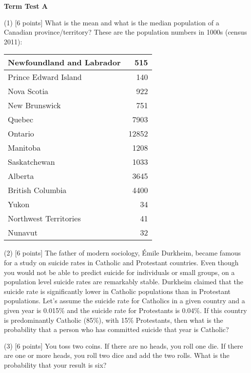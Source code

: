 \documentclass[11pt]{article}
\newcounter{aufg}
\newcommand{\aufgabe}[1]{\refstepcounter{aufg}\textbf{(\arabic{aufg})}
[#1 points]}
\begin{document}
\textbf{Term Test A}

(1) [6 points] What is the mean and what is the median population of a Canadian
province/territory? These are the population numbers in 1000s (census 2011):

\bigskip

\begin{tabular}{|l|r|} \hline
Newfoundland and Labrador & 515   \\ \hline
Prince Edward Island      & 140   \\ \hline
Nova Scotia               & 922   \\ \hline
New Brunswick             & 751   \\ \hline
Quebec                    & 7903  \\ \hline
Ontario                   & 12852 \\ \hline
Manitoba                  & 1208  \\ \hline
Saskatchewan              & 1033  \\ \hline
Alberta                   & 3645  \\ \hline
British Columbia          & 4400  \\ \hline
Yukon                     & 34    \\ \hline
Northwest Territories     & 41    \\ \hline
Nunavut                   & 32    \\ \hline
\end{tabular}

\bigskip

(2) [6 points] The father of modern sociology, {\'E}mile Durkheim,
became famous for a study on suicide rates in Catholic and Protestant
countries. Even though you would not be able to predict suicide for
individuals or small groups, on a population level suicide rates are
remarkably stable. Durkheim claimed that the suicide rate is
significantly lower in Catholic populations than in Protestant
populations. Let's assume the suicide rate for Catholics in a given
country and a given year is 0.015\% and the suicide rate for
Protestants is 0.04\%. If this country is predominantly Catholic
(85\%), with 15\% Protestants, then what is the probability that a
person who has committed suicide that year is Catholic?

\newpage

(3) [6 points] You toss two coins. If there are no heads, you roll one die. If
there are one or more heads, you roll two dice and add the two rolls.
What is the probability that your result is six?
\end{document}
